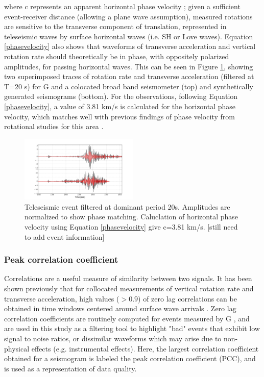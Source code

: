 \documentclass{gji}
\begin{document}
\noindent where c represents an apparent horizontal phase velocity \cite{igel2005rotational}; given a sufficient event-receiver distance (allowing a plane wave assumption), measured rotations are sensitive to the transverse component of translation, represented in teleseismic waves by surface horizontal waves (i.e. SH or Love waves). Equation \ref{phasevelocity} also shows that waveforms of transverse acceleration and vertical rotation rate should theoretically be in phase, with oppositely polarized amplitudes, for passing horizontal waves. This can be seen in Figure \ref{fig:rr_ta}, showing two superimposed traces of rotation rate and transverse acceleration (filtered at T=20 s) for G and a colocated broad band seismometer (top) and synthetically generated seismograms (bottom). For the observations, following Equation \ref{phasevelocity}, a value of 3.81 km/s is calculated for the horizontal phase velocity, which matches well with previous findings of phase velocity from rotational studies for this area \cite{igel2007broad}.



\begin{figure}
\centerline{\includegraphics[width=0.5\textwidth]{rr_ta}}
\caption{Teleseismic event filtered at dominant period 20s. Amplitudes are normalized to show phase matching. Caluclation of horizontal phase velocity using Equation \ref{phasevelocity} give c=3.81 km/s. [still need to add event information]}
\label{fig:rr_ta}
\end{figure}

\subsubsection{Peak correlation coefficient}
Correlations are a useful measure of similarity between two signals. It has been shown previously that for collocated measurements of vertical rotation rate and transverse acceleration, high values ($>0.9$) of zero lag correlations can be obtained in time windows centered around surface wave arrivals \cite{igel2007broad}.
Zero lag correlation coefficients are routinely computed for events measured by G \cite{salvermoser2017event},
and are used in this study as a filtering tool to highlight "bad" events that exhibit low signal to noise ratios, or dissimilar waveforms which may arise due to non-physical effects (e.g. instrumental effects). Here, the largest correlation coefficient obtained for a seismogram is labeled the peak correlation coefficient (PCC), and is used as a representation of data quality.
\end{document}
